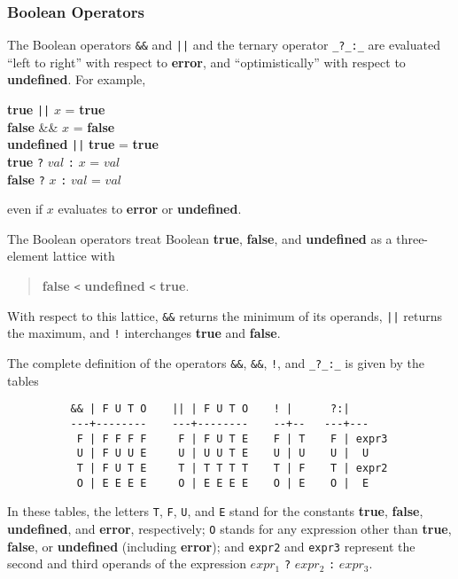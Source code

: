 \documentclass{article}
\begin{document}
\subsubsection{Boolean Operators}
\label{sec:boolean_ops}
The Boolean operators \verb|&&| and \verb/||/
and the ternary operator \verb|_?_:_| are evaluated ``left to right''
with respect to \textbf{error}, and ``optimistically'' with respect to
\textbf{undefined}.
For example,
\begin{tabbing}
\hspace{2em}\=
    \textbf{true} \verb/||/ $x$ = \textbf{true} \\
    \> \textbf{false} \&\& $x$ = \textbf{false} \\
    \> \textbf{undefined} \verb/||/ \textbf{true} = \textbf{true} \\
    \> \textbf{true} \verb|?| $val$ \verb|:| $x$ = $val$ \\
    \> \textbf{false} \verb|?| $x$ \verb|:| $val$ = $val$
\end{tabbing}
even if $x$ evaluates to \textbf{error} or \textbf{undefined}.

The Boolean operators treat Boolean \textbf{true}, \textbf{false}, and
\textbf{undefined} as a three-element lattice with
\begin{quote}
\textbf{false} \verb/</ \textbf{undefined} \verb/</ \textbf{true}.
\end{quote}
With respect to this lattice, \verb/&&/ returns the minimum of its operands,
\verb/||/ returns the maximum, and \verb/!/ interchanges \textbf{true} and
\textbf{false}.

The complete definition of the operators \verb|&&|, \verb|&&|,
\verb|!|, and \verb|_?_:_| is given by the tables
\begin{verbatim}
          && | F U T O    || | F U T O    ! |      ?:|
          ---+--------    ---+--------    --+--   ---+---
           F | F F F F     F | F U T E    F | T    F | expr3
           U | F U U E     U | U U T E    U | U    U |  U
           T | F U T E     T | T T T T    T | F    T | expr2
           O | E E E E     O | E E E E    O | E    O |  E
\end{verbatim}
In these tables, the letters
\verb|T|, \verb|F|, \verb|U|, and \verb|E|
stand for the constants
\textbf{true}, \textbf{false}, \textbf{undefined}, and \textbf{error},
respectively; 
\verb|O| stands for any expression other than 
\textbf{true}, \textbf{false}, or
\textbf{undefined} (including \textbf{error});
and \verb|expr2| and \verb|expr3| represent the second and third operands of
the expression $expr_1$ \verb|?| $expr_2$ \verb|:| $expr_3$.
\end{document}
